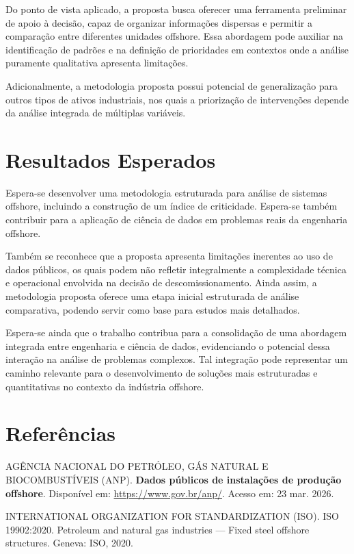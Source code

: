 \documentclass[a4paper,12pt]{article}
\begin{document}
Do ponto de vista aplicado, a proposta busca oferecer uma ferramenta preliminar de apoio à decisão, capaz de organizar informações dispersas e permitir a comparação entre diferentes unidades offshore. Essa abordagem pode auxiliar na identificação de padrões e na definição de prioridades em contextos onde a análise puramente qualitativa apresenta limitações.

Adicionalmente, a metodologia proposta possui potencial de generalização para outros tipos de ativos industriais, nos quais a priorização de intervenções depende da análise integrada de múltiplas variáveis.

\section{Resultados Esperados}

Espera-se desenvolver uma metodologia estruturada para análise de sistemas offshore, incluindo a construção de um índice de criticidade. Espera-se também contribuir para a aplicação de ciência de dados em problemas reais da engenharia offshore.

Também se reconhece que a proposta apresenta limitações inerentes ao uso de dados públicos, os quais podem não refletir integralmente a complexidade técnica e operacional envolvida na decisão de descomissionamento. Ainda assim, a metodologia proposta oferece uma etapa inicial estruturada de análise comparativa, podendo servir como base para estudos mais detalhados.

Espera-se ainda que o trabalho contribua para a consolidação de uma abordagem integrada entre engenharia e ciência de dados, evidenciando o potencial dessa interação na análise de problemas complexos. Tal integração pode representar um caminho relevante para o desenvolvimento de soluções mais estruturadas e quantitativas no contexto da indústria offshore.

\section*{Referências}

\begin{sloppypar}
\noindent
AGÊNCIA NACIONAL DO PETRÓLEO, GÁS NATURAL E BIOCOMBUSTÍVEIS (ANP).
\textbf{Dados públicos de instalações de produção offshore}.
Disponível em: \url{https://www.gov.br/anp/}.
Acesso em: 23 mar. 2026.
\end{sloppypar}

INTERNATIONAL ORGANIZATION FOR STANDARDIZATION (ISO). ISO 19902:2020. Petroleum and natural gas industries — Fixed steel offshore structures. Geneva: ISO, 2020.
\end{document}
